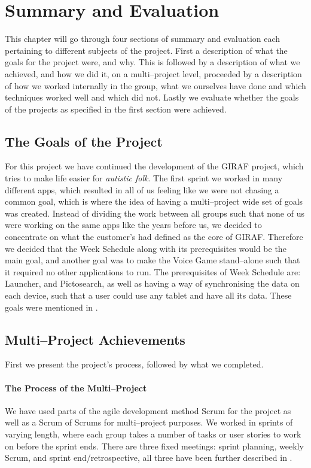 \chapter{Summary and Evaluation}
This chapter will go through four sections of summary and evaluation each pertaining to different subjects of the project.
First a description of what the goals for the project were, and why.
This is followed by a description of what we achieved, and how we did it, on a multi--project level, proceeded by a description of how we worked internally in the group, what we ourselves have done and which techniques worked well and which did not.
Lastly we evaluate whether the goals of the projects as specified in the first section were achieved.

\section{The Goals of the Project}

For this project we have continued the development of the GIRAF project, which tries to make life easier for \textit{autistic folk}.
The first sprint we worked in many different apps, which resulted in all of us feeling like we were not chasing a common goal, which is where the idea of having a multi--project wide set of goals was created.
Instead of dividing the work between all groups such that none of us were working on the same apps like the years before us, we decided to concentrate on what the customer's had defined as the core of GIRAF.
Therefore we decided that the Week Schedule along with its prerequisites would be the main goal, and another goal was to make the Voice Game stand--alone such that it required no other applications to run.
The prerequisites of Week Schedule are: Launcher, and Pictosearch, as well as having a way of synchronising the data on each device, such that a user could use any tablet and have all its data.
These goals were mentioned in .

\section{Multi--Project Achievements}
First we present the project's process, followed by what we completed.

\subsubsection*{The Process of the Multi--Project}
We have used parts of the agile development method Scrum for the project as well as a Scrum of Scrums for multi--project purposes.
We worked in sprints of varying length, where each group takes a number of tasks or user stories to work on before the sprint ends.
There are three fixed meetings: sprint planning, weekly Scrum, and sprint end/retrospective, all three have been further described in .

